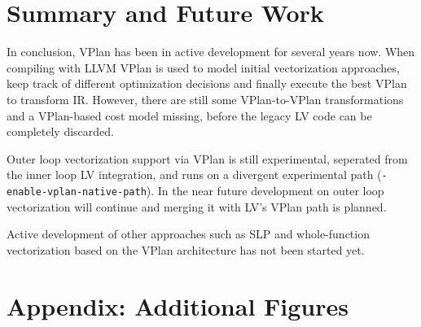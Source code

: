 \documentclass[sigplan,11pt,nonacm]{acmart}
\begin{document}


\section{Summary and Future Work}
\label{sec:summary}
In conclusion, VPlan has been in active development for several years now. When compiling with
LLVM VPlan is used to model initial vectorization approaches, keep track of different
optimization decisions and finally execute the best VPlan to transform IR. 
However, there are still some VPlan-to-VPlan transformations and a VPlan-based cost model missing, 
before the legacy LV code can be completely discarded.

Outer loop vectorization support via VPlan is still experimental, seperated from the inner loop
LV integration, and runs on a divergent experimental path (\texttt{-enable-\allowbreak vplan-\allowbreak native-\allowbreak path}).
In the near future development on outer loop vectorization will continue and merging it with LV's
VPlan path is planned.

Active development of other approaches such as SLP and whole-function vectorization based on the 
VPlan architecture has not been started yet.




\appendix

\section{Appendix: Additional Figures}\label{appendix-figures}
\end{document}

